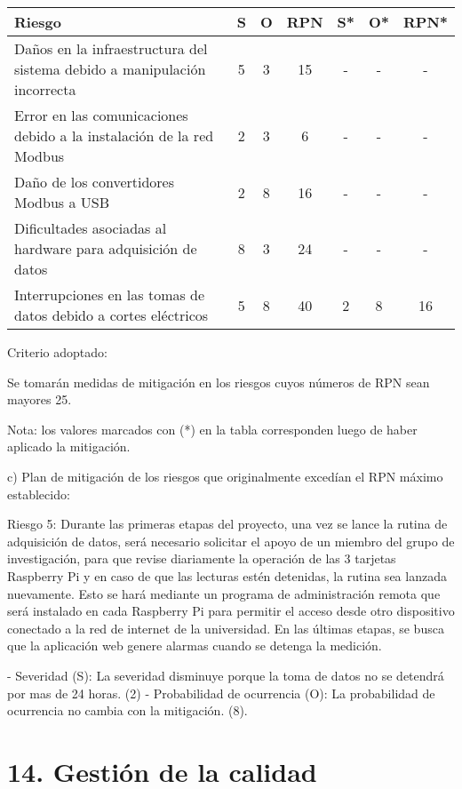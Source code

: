 \documentclass[
11pt, %
codirector, %
]{charter}
\begin{document}
\begin{table}[htpb]
\centering
\begin{tabularx}{\linewidth}{@{}|X|c|c|c|c|c|c|@{}}
\hline
\rowcolor[HTML]{C0C0C0} 
Riesgo & S & O & RPN & S* & O* & RPN* \\ \hline
Daños en la infraestructura del sistema debido a manipulación incorrecta & 5 & 3 & 15 & - & - & - \\ \hline
Error en las comunicaciones debido a la instalación de la red Modbus & 2 & 3 & 6 & - & - & - \\ \hline
Daño de los convertidores Modbus a USB & 2 & 8 & 16 & - & - & - \\ \hline
Dificultades asociadas al hardware para adquisición de datos & 8 & 3 & 24 & - & - & - \\ \hline
Interrupciones en las tomas de datos debido a cortes eléctricos & 5 & 8 & 40 & 2 & 8 & 16 \\ \hline
\end{tabularx}%
\end{table}

Criterio adoptado: 

Se tomarán medidas de mitigación en los riesgos cuyos números de RPN sean mayores 25.

Nota: los valores marcados con (*) en la tabla corresponden luego de haber aplicado la mitigación.

c) Plan de mitigación de los riesgos que originalmente excedían el RPN máximo establecido:
 
Riesgo 5: Durante las primeras etapas del proyecto, una vez se lance la rutina de adquisición de datos,  será necesario solicitar el apoyo de un miembro del grupo de investigación, para que revise diariamente la operación de las 3 tarjetas Raspberry Pi y en caso de que las lecturas estén detenidas, la rutina sea lanzada nuevamente. Esto se hará mediante un programa de administración remota que será instalado en cada Raspberry Pi para permitir el acceso desde otro dispositivo conectado a la red de internet de la universidad.
En las últimas etapas, se busca que la aplicación web genere alarmas cuando se detenga la medición.

  - Severidad (S): La severidad disminuye porque la toma de datos no se detendrá por mas de 24 horas. (2)
  - Probabilidad de ocurrencia (O): La probabilidad de ocurrencia no cambia con la mitigación. (8).



\section{14. Gestión de la calidad}
\label{sec:calidad}
\end{document}
